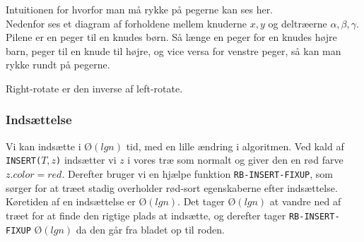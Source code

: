 Intuitionen for hvorfor man må rykke på pegerne kan ses her.\\
Nedenfor ses et diagram af forholdene mellem knuderne $x, y$ og deltræerne $\alpha, \beta, \gamma$. Pilene er en peger til en knudes børn. Så længe en peger for en knudes højre barn, peger til en knude til højre, og vice versa for venstre peger, så kan man rykke rundt på pegerne.
\begin{center}
\end{center}

Right-rotate er den inverse af left-rotate.
\subsubsection{Indsættelse}
Vi kan indsætte i $Ø(lgn)$ tid, med en lille ændring i algoritmen. Ved kald af \texttt{INSERT($T,z$)} indsætter vi $z$ i vores træ som normalt og giver den en rød farve $z.color=red$. Derefter bruger vi en hjælpe funktion \texttt{RB-INSERT-FIXUP}, som sørger for at træet stadig overholder rød-sort egenskaberne efter indsættelse.\\

Køretiden af en indsættelse er $Ø(lgn)$. Det tager $Ø(lgn)$ at vandre ned af træet for at finde den rigtige plads at indsætte, og derefter tager \texttt{RB-INSERT-FIXUP} $Ø(lgn)$ da den går fra bladet op til roden.

